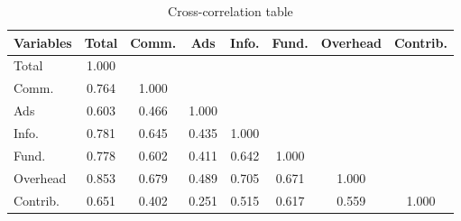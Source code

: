 \begin{table}[htbp]\centering \caption{Cross-correlation table\label{corrtable}}
\begin{tabular}{l  c  c  c  c  c  c  c }\hline\hline
\multicolumn{1}{c}{Variables} &Total&Comm.&Ads&Info.&Fund.&Overhead&Contrib.\\ \hline
Total&1.000\\
Comm.&0.764&1.000\\
Ads&0.603&0.466&1.000\\
Info.&0.781&0.645&0.435&1.000\\
Fund.&0.778&0.602&0.411&0.642&1.000\\
Overhead&0.853&0.679&0.489&0.705&0.671&1.000\\
Contrib.&0.651&0.402&0.251&0.515&0.617&0.559&1.000\\
\hline \hline 
 \end{tabular}
\end{table}
